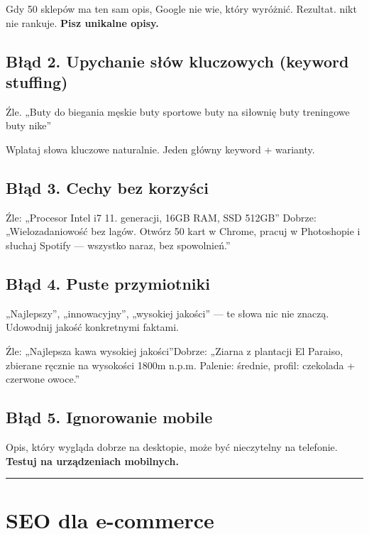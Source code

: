 \documentclass[
  12pt,
  a4paper,
  twoside,
  openright,
  12pt,
  DIV=12,
  BCOR=12mm]{scrbook}
\newcommand{\decoline}{%
  \begin{center}
    \textcolor{bordergray}{\rule{0.3\textwidth}{0.5pt}}
  \end{center}
}
\begin{document}
Gdy 50 sklepów ma ten sam opis, Google nie wie, który wyróżnić.
Rezultat. nikt nie rankuje. \textbf{Pisz unikalne opisy.}

\subsection{Błąd 2. Upychanie słów kluczowych (keyword
stuffing)}\label{bux142ux105d-2.-upychanie-sux142uxf3w-kluczowych-keyword-stuffing}

Źle. „Buty do biegania męskie buty sportowe buty na siłownię buty
treningowe buty nike''

Wplataj słowa kluczowe naturalnie. Jeden główny keyword + warianty.

\subsection{Błąd 3. Cechy bez
korzyści}\label{bux142ux105d-3.-cechy-bez-korzyux15bci}

Źle: „Procesor Intel i7 11. generacji, 16GB RAM, SSD 512GB''\newline
Dobrze: „Wielozadaniowość bez lagów. Otwórz 50 kart w Chrome, pracuj w
Photoshopie i słuchaj Spotify --- wszystko naraz, bez spowolnień.''

\subsection{Błąd 4. Puste
przymiotniki}\label{bux142ux105d-4.-puste-przymiotniki}

„Najlepszy'', „innowacyjny'', „wysokiej jakości'' --- te słowa nic nie
znaczą. Udowodnij jakość konkretnymi faktami.

Źle: „Najlepsza kawa wysokiej jakości''\newline Dobrze: „Ziarna z
plantacji El Paraiso, zbierane ręcznie na wysokości 1800m n.p.m.
Palenie: średnie, profil: czekolada + czerwone owoce.''

\subsection{Błąd 5. Ignorowanie
mobile}\label{bux142ux105d-5.-ignorowanie-mobile}

Opis, który wygląda dobrze na desktopie, może być nieczytelny na
telefonie. \textbf{Testuj na urządzeniach mobilnych.}

\decoline

\section{SEO dla e-commerce}\label{seo-dla-e-commerce}
\end{document}
